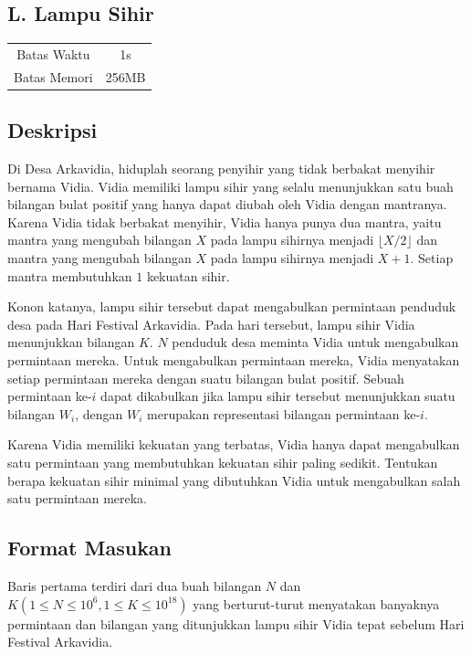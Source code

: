 \documentclass{article}
\begin{document}
\begin{center}
    \section*{L. Lampu Sihir} %

    \begin{tabular}{ | c c | }
        \hline
        Batas Waktu  & 1s \\    %
        Batas Memori & 256MB \\  %
        \hline
    \end{tabular}
\end{center}

\subsection*{Deskripsi}
Di Desa Arkavidia, hiduplah seorang penyihir yang tidak berbakat menyihir bernama Vidia. Vidia memiliki lampu sihir yang selalu menunjukkan satu buah bilangan bulat positif yang hanya dapat diubah oleh Vidia dengan mantranya. Karena Vidia tidak berbakat menyihir, Vidia hanya punya dua mantra, yaitu mantra yang mengubah bilangan $X$ pada lampu sihirnya menjadi $\lfloor X/2 \rfloor$ dan mantra yang mengubah bilangan $X$ pada lampu sihirnya menjadi $X+1$. Setiap mantra membutuhkan $1$ kekuatan sihir.

Konon katanya, lampu sihir tersebut dapat mengabulkan permintaan penduduk desa pada Hari Festival Arkavidia. Pada hari tersebut, lampu sihir Vidia menunjukkan bilangan $K$. $N$ penduduk desa meminta Vidia untuk mengabulkan permintaan mereka. Untuk mengabulkan permintaan mereka, Vidia menyatakan setiap permintaan mereka dengan suatu bilangan bulat positif. Sebuah permintaan ke-$i$ dapat dikabulkan jika lampu sihir tersebut menunjukkan suatu bilangan $W_i$, dengan $W_i$ merupakan representasi bilangan permintaan ke-$i$.

Karena Vidia memiliki kekuatan yang terbatas, Vidia hanya dapat mengabulkan satu permintaan yang membutuhkan kekuatan sihir paling sedikit. Tentukan berapa kekuatan sihir minimal yang dibutuhkan Vidia untuk mengabulkan salah satu permintaan mereka.

\subsection*{Format Masukan}
Baris pertama terdiri dari dua buah bilangan $N$ dan $K (1 \leq N \leq 10^6, 1\leq K \leq 10^{18})$ yang berturut-turut menyatakan banyaknya permintaan dan bilangan yang ditunjukkan lampu sihir Vidia tepat sebelum Hari Festival Arkavidia.
\end{document}
